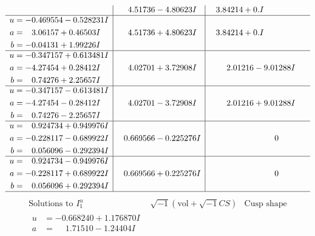 \documentclass[1p]{elsarticle_modified}
\theoremstyle{definition}
\newcommand{\I}{\sqrt{-1}}
\begin{document}
$$\begin{array}{c|c|c}
 & \phantom{-}4.51736 - 4.80623 I & \phantom{-}3.84214 + 0. I\phantom{ +0.000000I} \\ \hline\begin{aligned}
u &= -0.469554 - 0.528231 I \\
a &= \phantom{-}3.06157 + 0.46503 I \\
b &= -0.04131 + 1.99226 I\end{aligned}
 & \phantom{-}4.51736 + 4.80623 I & \phantom{-}3.84214 + 0. I\phantom{ +0.000000I} \\ \hline\begin{aligned}
u &= -0.347157 + 0.613481 I \\
a &= -4.27454 + 0.28412 I \\
b &= \phantom{-}0.74276 + 2.25657 I\end{aligned}
 & \phantom{-}4.02701 + 3.72908 I & \phantom{-}2.01216 - 9.01288 I \\ \hline\begin{aligned}
u &= -0.347157 - 0.613481 I \\
a &= -4.27454 - 0.28412 I \\
b &= \phantom{-}0.74276 - 2.25657 I\end{aligned}
 & \phantom{-}4.02701 - 3.72908 I & \phantom{-}2.01216 + 9.01288 I \\ \hline\begin{aligned}
u &= \phantom{-}0.924734 + 0.949976 I \\
a &= -0.228117 - 0.689922 I \\
b &= \phantom{-}0.056096 - 0.292394 I\end{aligned}
 & \phantom{-}0.669566 - 0.225276 I & \phantom{-0.000000 } 0 \\ \hline\begin{aligned}
u &= \phantom{-}0.924734 - 0.949976 I \\
a &= -0.228117 + 0.689922 I \\
b &= \phantom{-}0.056096 + 0.292394 I\end{aligned}
 & \phantom{-}0.669566 + 0.225276 I & \phantom{-0.000000 } 0\\
 \hline 
 \end{array}$$\newpage$$\begin{array}{c|c|c}  
\text{Solutions to }I^u_{1}& \I (\text{vol} + \sqrt{-1}CS) & \text{Cusp shape}\\
 \hline 
\begin{aligned}
u &= -0.668240 + 1.176870 I \\
a &= \phantom{-}1.71510 - 1.24404 I \\

\end{aligned}
\end{array}$$
\end{document}
